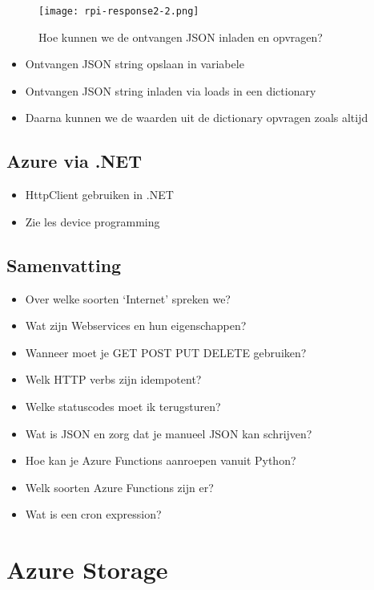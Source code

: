 \documentclass{article}
\begin{document}
\begin{figure}[H]
    \centering
    \texttt{[image: rpi-response2-2.png]}
    \caption{Hoe kunnen we de ontvangen JSON inladen en opvragen?}
\end{figure}

\begin{itemize}
    \item Ontvangen JSON string opslaan in variabele
    \item Ontvangen JSON string inladen via loads in een dictionary
    \item Daarna kunnen we de waarden uit de dictionary opvragen zoals altijd
\end{itemize}

\subsection{Azure via .NET}
\begin{itemize}
    \item HttpClient gebruiken in .NET
    \item Zie les device programming
\end{itemize}


\subsection{Samenvatting}
\begin{itemize}
    \item Over welke soorten `Internet'  spreken we?
    \item Wat zijn Webservices en hun eigenschappen?
    \item Wanneer moet je GET POST PUT DELETE gebruiken?
    \item Welk HTTP verbs zijn idempotent?
    \item Welke statuscodes moet ik terugsturen?
    \item Wat is JSON en zorg dat je manueel JSON kan schrijven?
    \item Hoe kan je Azure Functions aanroepen vanuit Python?
    \item Welk soorten Azure Functions zijn er?
    \item Wat is een cron expression?
\end{itemize}

\section{Azure Storage}
\end{document}
